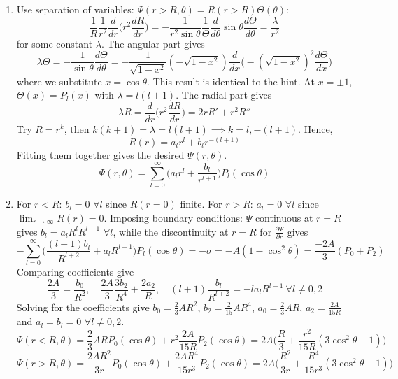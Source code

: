 \documentclass[a4paper]{article}
\begin{document}
\begin{ans}\leavevmode
\begin{enumerate}[label=(\roman*)]
\item Use separation of variables: $\Psi(r>R,\theta)=R(r>R)\Theta(\theta)$:
$$\frac{1}{R}\frac{1}{r^2}\frac{d}{dr}\bigg(r^2\frac{dR}{dr}\bigg)=-\frac{1}{r^2\sin\theta}\frac{1}{\Theta}\frac{d}{d\theta}\sin\theta\frac{d\Theta}{d\theta}=\frac{\lambda}{r^2}$$
for some constant $\lambda$. The angular part gives
$$\lambda\Theta=-\frac{1}{\sin\theta}\frac{d\Theta}{d\theta}=-\frac{1}{\sqrt{1-x^2}}(-\sqrt{1-x^2})\frac{d}{dx}\bigg(-(\sqrt{1-x^2})^2\frac{d\Theta}{dx}\bigg)$$
where we substitute $x=\cos\theta$. This result is identical to the hint. At $x=\pm1$, $\Theta(x)=P_l(x)$ with $\lambda=l(l+1)$. The radial part gives
$$\lambda R=\frac{d}{dr}\bigg(r^2\frac{dR}{dr}\bigg)=2rR'+r^2R''$$
Try $R=r^k$, then $k(k+1)=\lambda=l(l+1)\implies k=l,-(l+1)$. Hence, $$R(r)=a_lr^l+b_lr^{-(l+1)}$$ Fitting them together gives the desired $\Psi(r,\theta)$.
$$\Psi(r,\theta)=\sum_{l=0}^\infty\bigg(a_lr^l+\frac{b_l}{r^{l+1}}\bigg)P_l(\cos\theta)$$
\item For $r<R$: $b_l=0$ $\forall l$ since $R(r=0)$ finite. For $r>R$: $a_l=0$ $\forall l$ since $\lim_{r\rightarrow\infty}R(r)=0$. Imposing boundary conditions: $\Psi$ continuous at $r=R$ gives $b_l=a_lR^lR^{l+1}$ $\forall l$, while the discontinuity at $r=R$ for $\frac{\partial\Psi}{\partial r}$ gives
$$-\sum_{l=0}^\infty\bigg(\frac{(l+1)b_l}{R^{l+2}}+a_lR^{l-1}\bigg)P_l(\cos\theta)=-\sigma=-A(1-\cos^2\theta)=\frac{-2A}{3}(P_0+P_2)$$
Comparing coefficients give 
$$\frac{2A}{3}=\frac{b_0}{R^2},\quad\frac{2A}{3}\frac{3b_2}{R^4}+\frac{2a_2}{R},\quad(l+1)\frac{b_l}{R^{l+2}}=-la_lR^{l-1}~\forall l\neq 0,2$$
Solving for the coefficients give $b_0=\frac{2}{3}AR^2$, $b_2=\frac{2}{15}AR^4$, $a_0=\frac{2}{3}AR$, $a_2=\frac{2A}{15R}$ and $a_l=b_l=0$ $\forall l\neq 0,2$.
$$\Psi(r<R,\theta)=\frac{2}{3}ARP_0(\cos\theta)+r^2\frac{2A}{15R}P_2(\cos\theta)=2A\bigg(\frac{R}{3}+\frac{r^2}{15R}(3\cos^2\theta-1)\bigg)$$
$$\Psi(r>R,\theta)=\frac{2AR^2}{3r}P_0(\cos\theta)+\frac{2AR^4}{15r^3}P_2(\cos\theta)=2A\bigg(\frac{R^2}{3r}+\frac{R^4}{15r^3}(3\cos^2\theta-1)\bigg)$$
\end{enumerate}
\end{ans}
\newpage
\end{document}

